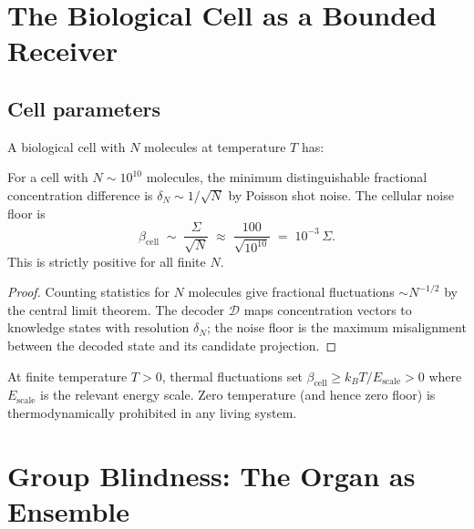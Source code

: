 \documentclass[twocolumn,11pt,a4paper]{article}
\begin{document}
\section{The Biological Cell as a Bounded Receiver}
\label{sec:cell-receiver}

\subsection{Cell parameters}

A biological cell with $N$ molecules at temperature $T$ has:

\begin{proposition}\label{prop:cell-floor}
For a cell with $N \sim 10^{10}$ molecules, the minimum distinguishable
fractional concentration difference is $\delta_N \sim 1/\sqrt{N}$ by
Poisson shot noise. The cellular noise floor is
\[
\beta_{\mathrm{cell}} \;\sim\; \frac{\Sigma}{\sqrt{N}}
\;\approx\; \frac{100}{\sqrt{10^{10}}} \;=\; 10^{-3}\,\Sigma.
\]
This is strictly positive for all finite $N$.
\end{proposition}

\begin{proof}
Counting statistics for $N$ molecules give fractional fluctuations
$\sim N^{-1/2}$ by the central limit theorem. The decoder
$\mathcal{D}$ maps concentration vectors to knowledge states with
resolution $\delta_N$; the noise floor is the maximum misalignment
between the decoded state and its candidate projection.
\end{proof}

\begin{corollary}\label{cor:temp}
At finite temperature $T > 0$, thermal fluctuations set
$\beta_{\mathrm{cell}} \geq k_B T / E_{\mathrm{scale}} > 0$ where
$E_{\mathrm{scale}}$ is the relevant energy scale. Zero temperature
(and hence zero floor) is thermodynamically prohibited in any living
system.
\end{corollary}

\section{Group Blindness: The Organ as Ensemble}
\label{sec:group}
\end{document}
